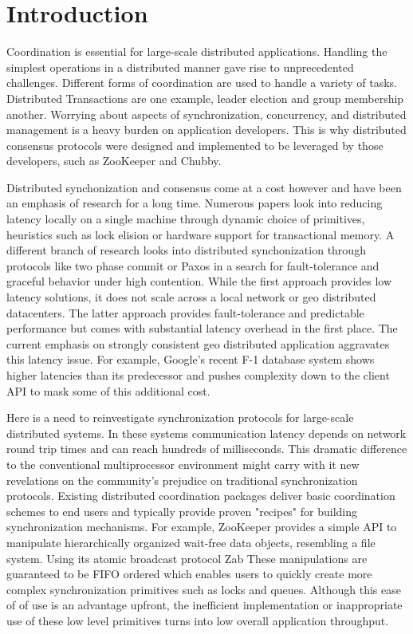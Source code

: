 \section{Introduction}\label{sec:intro}

Coordination is essential for large-scale distributed applications. Handling the simplest operations in a distributed manner gave rise to unprecedented challenges. Different forms of coordination are used to handle a variety of tasks. Distributed Transactions are one example, leader election and group membership another. Worrying about aspects of synchronization, concurrency, and distributed management is a heavy burden on application developers. This is why distributed consensus protocols were designed and implemented to be leveraged by those developers, such as ZooKeeper\cite{zookeeper} and Chubby\cite{chubby}.

Distributed synchonization and consensus come at a cost however and have been an emphasis of research for a long time.\cite{reactive} Numerous papers look into reducing latency locally on a single machine through dynamic choice of primitives\cite{reactive}, heuristics such as lock elision\cite{lock_elison} or hardware support for transactional memory\cite{transactional_memory}. A different branch of research looks into distributed synchonization through protocols like two phase commit\cite{two_phase_commit} or Paxos\cite{paxos} in a search for fault-tolerance and graceful behavior under high contention. While the first approach provides low latency solutions, it does not scale across a local network or geo distributed datacenters. The latter approach provides fault-tolerance and predictable performance but comes with substantial latency overhead in the first place. The current emphasis on strongly consistent geo distributed application aggravates this latency issue. For example, Google's recent F-1 database system \cite{google_f1} shows higher latencies than its predecessor and pushes complexity down to the client API to mask some of this additional cost.

Here is a need to reinvestigate synchronization protocols for large-scale distributed systems. In these systems communication latency depends on network round trip times and can reach hundreds of milliseconds. This dramatic difference to the conventional multiprocessor environment might carry with it new revelations on the community's prejudice on traditional synchronization protocols. Existing distributed coordination packages deliver basic coordination schemes to end users and typically provide proven "recipes" \cite{zookeeper_recipes} for building synchronization mechanisms. For example, ZooKeeper provides a simple API to manipulate hierarchically organized wait-free data objects, resembling a file system. Using its atomic broadcast protocol Zab\cite{ZAB} These manipulations are guaranteed to be FIFO ordered which enables users to quickly create more complex synchronization primitives such as locks and queues. Although this ease of of use is an advantage upfront, the inefficient implementation or inappropriate use of these low level primitives turns into low overall application throughput.

